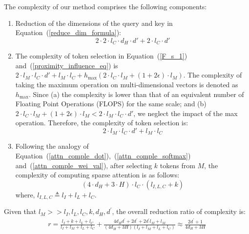 The complexity of our method comprises the following components:
\begin{enumerate}
    \item Reduction of the dimensions of the query and key in Equation~(\ref{reduce_dim_formula}):
    \begin{equation}
      2 \cdot 2 \cdot l_C \cdot d_{H} \cdot d' + 2 \cdot l_C \cdot d'
    \end{equation}
    \item The complexity of token selection in Equation~(\ref{F_s_1}) and~(\ref{proximity_influence_eq}) is
    $2 \cdot l_M \cdot l_C \cdot d' + l_{M} \cdot l_C + h_{\text{max}}(2 \cdot l_C \cdot l_M + (1 + 2 \epsilon) \cdot l_M)$. The complexity of taking the maximum operation on multi-dimensional vectors is denoted as \( h_{\text{max}} \). Since (a) the complexity is lower than that of an equivalent number of Floating Point Operations (FLOPS)  for the same scale; and (b) $2 \cdot l_C \cdot l_M + (1 + 2 \epsilon) \cdot l_M < 2 \cdot l_M \cdot l_C \cdot d'$, we neglect the impact of the max operation. Therefore, the complexity of token selection is:
    \begin{equation}
      2 \cdot l_M \cdot l_C \cdot d' + l_{M} \cdot l_C
    \end{equation}
    \item Following the analogy of Equation~(\ref{attn_comple_dot}),~(\ref{attn_comple_softmax}) and~(\ref{attn_comple_wei_val}), after selecting $k$ tokens from $M$, the complexity of computing sparse attention is as follows:
    \begin{equation}
      (4 \cdot d_{H} + 3 \cdot H ) \cdot l_{C} \cdot (l_{I,L,C}+k)
    \end{equation}
    where, $l_{I,L,C} \triangleq l_{I}+l_{L}+l_{C}$.
\end{enumerate}
Given that $l_M >> l_{I},l_{L},l_{C},k,d_{H},d^{\prime}$, the overall reduction ratio of complexity is:
\begin{align} \label{reduction_ratio_complexity_infer}
r = \frac{l_I + k + l_L + l_C}{l_I + l_M + l_L + l_C} + \frac{4 d_{H} d^{\prime} + 2 d^{\prime} + 2 d^{\prime} l_M + l_M}{(4 d_{H} + 3H) (l_I + l_M + l_L + l_C)} \approx \frac{2 d^{\prime} +1}{4d_{H} + 3H}
\end{align}

